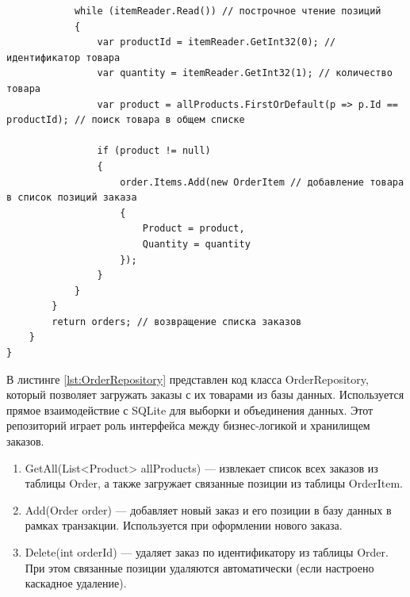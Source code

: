 \documentclass[12pt]{article}
\renewcommand{\texttt}[1]{{\small\ttfamily #1}}
\newenvironment{code}{\captionsetup{type=listing}}{}
\numberwithin{listing}{section}
\numberwithin{figure}{section}
\begin{document}
\begin{code}
\begin{verbatim}
            while (itemReader.Read()) // построчное чтение позиций
            {
                var productId = itemReader.GetInt32(0); // идентификатор товара
                var quantity = itemReader.GetInt32(1); // количество товара
                var product = allProducts.FirstOrDefault(p => p.Id == productId); // поиск товара в общем списке

                if (product != null)
                {
                    order.Items.Add(new OrderItem // добавление товара в список позиций заказа
                    {
                        Product = product,
                        Quantity = quantity
                    });
                }
            }
        }
        return orders; // возвращение списка заказов
    }
}
    \end{verbatim}
	\label{lst:OrderRepository}
\end{code}
В листинге \ref{lst:OrderRepository} представлен код класса \texttt{OrderRepository}, который позволяет загружать заказы с их товарами из базы данных. Используется прямое взаимодействие с SQLite для выборки и объединения данных. Этот репозиторий играет роль интерфейса между бизнес-логикой и хранилищем заказов.


\begin{enumerate}
	\item \texttt{GetAll(List<Product> allProducts)} — извлекает список всех заказов из таблицы \texttt{Order}, а также загружает связанные позиции из таблицы \texttt{OrderItem}.
	\item \texttt{Add(Order order)} — добавляет новый заказ и его позиции в базу данных в рамках транзакции. Используется при оформлении нового заказа.
	\item \texttt{Delete(int orderId)} — удаляет заказ по идентификатору из таблицы \texttt{Order}. При этом связанные позиции удаляются автоматически (если настроено каскадное удаление).
\end{enumerate}
\end{document}

